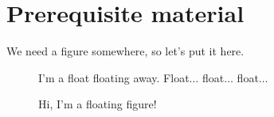 \chapter{Prerequisite material}

We need a figure somewhere, so let's put it here.

\begin{figure}[h]
  \centering
  I'm a float floating away. Float$\ldots$ float$\ldots$ float$\ldots$
  \caption{Hi, I'm a floating figure!}
  \label{fig:floating-stuff}
\end{figure}

